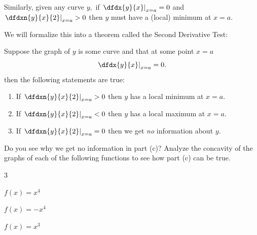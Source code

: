 Similarly, given any curve $y,$ if $\left.\dfdx{y}{x}\right|_{x=a}=0$
and $\left.\dfdxn{y}{x}{2}\right|_{x=a}> 0$
then $y$ must have a (local) minimum at $x=a.$

We will formalize this into a theorem called the
Second Derivative Test:

\begin{mytheorem}
  Suppose the graph of $y$ is some curve and that at some point $x=a$
  $$\left.\dfdx{y}{x}\right|_{x=a}=0.$$
  then the following statements are true:
  \begin{enumerate}[label={\bf{}(\alph*)}]{}
  \item If $\left.\dfdxn{y}{x}{2}\right|_{x=a}>0$ then $y$ has a local
    minimum at $x=a.$
  \item If $\left.\dfdxn{y}{x}{2}\right|_{x=a}<0$ then $y$ has a local
    maximum at $x=a.$
  \item If $\left.\dfdxn{y}{x}{2}\right|_{x=a}=0$ then we get
    \emph{no} information about $y.$
  \end{enumerate}
\end{mytheorem}

\begin{ProficiencyDrill}
  Do you see why we get no information in part (c)? Analyze the
  concavity of the graphs of each of the
  following functions to see how part (c) can be true.
  \begin{enumerate}[label={\bf{}(\alph*)}]
    \begin{multicols}{3}
    \item $f(x)=x^4$
    \item $f(x)=-x^4$
    \item $f(x)= x^3$
    \end{multicols}
  \end{enumerate}
\end{ProficiencyDrill}




